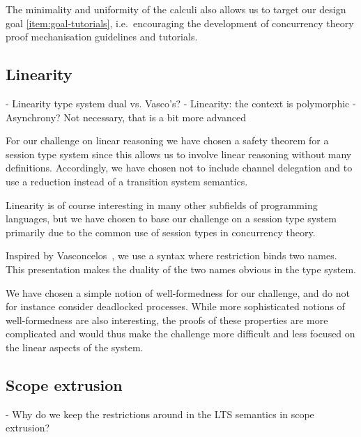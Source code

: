 \documentclass[runningheads]{llncs}
\begin{document}
The minimality and uniformity of the calculi also allows us to target our
design goal \ref{item:goal-tutorials}, i.e.~encouraging the development of
concurrency theory proof mechanisation guidelines and tutorials.



\subsection{Linearity}
- Linearity type system dual vs. Vasco's?
- Linearity: the context is polymorphic
- Asynchrony? Not necessary, that is a bit more advanced

For our challenge on linear reasoning we have chosen a safety theorem
for a session type system since this allows us to involve linear
reasoning without many definitions. Accordingly, we have chosen not to
include channel delegation and to use a reduction instead of a
transition system semantics.

Linearity is of course interesting in many other subfields of programming languages, but we have chosen to base our challenge on a session type system primarily due to the common use of session types in concurrency theory.

Inspired by Vasconcelos~\cite{Vasconcelos2012}, we use a syntax where
restriction binds two names. This presentation makes the duality
of the two names obvious in the type system.

We have chosen a simple notion of well-formedness for our challenge,
and do not for instance consider deadlocked processes. While more
sophisticated notions of well-formedness are also interesting, the
proofs of these properties are more complicated and would thus make
the challenge more difficult and less focused on the linear
aspects of the system.

\subsection{Scope extrusion}
- Why do we keep the restrictions around in the LTS semantics in scope extrusion?
\end{document}

